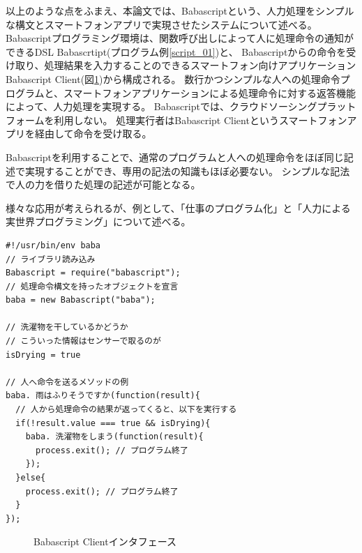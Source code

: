 \documentclass[twoside]{wiss}
\begin{document}
以上のような点をふまえ、本論文では、Babascriptという、人力処理をシンプルな構文とスマートフォンアプリで実現させたシステムについて述べる。
Babascriptプログラミング環境は、関数呼び出しによって人に処理命令の通知ができるDSL Babascrtipt(プログラム例\ref{script_01})と、
% 
Babascriptからの命令を受け取り、処理結果を入力することのできるスマートフォン向けアプリケーションBabascript Client(図\ref{webapp-interface})から構成される。
数行かつシンプルな人への処理命令プログラムと、スマートフォンアプリケーションによる処理命令に対する返答機能によって、人力処理を実現する。
Babascriptでは、クラウドソーシングプラットフォームを利用しない。
処理実行者はBabascript Clientというスマートフォンアプリを経由して命令を受け取る。

Babascriptを利用することで、通常のプログラムと人への処理命令をほぼ同じ記述で実現することができ、専用の記法の知識もほぼ必要ない。
シンプルな記法で人の力を借りた処理の記述が可能となる。

様々な応用が考えられるが、例として、「仕事のプログラム化」と「人力による実世界プログラミング」について述べる。

\begin{lstlisting}[caption=Babascriptプログラム例,label=script_01]
#!/usr/bin/env baba
// ライブラリ読み込み
Babascript = require("babascript");
// 処理命令構文を持ったオブジェクトを宣言
baba = new Babascript("baba");

// 洗濯物を干しているかどうか
// こういった情報はセンサーで取るのが
isDrying = true

// 人へ命令を送るメソッドの例
baba. 雨はふりそうですか(function(result){
  // 人から処理命令の結果が返ってくると、以下を実行する
  if(!result.value === true && isDrying){
    baba. 洗濯物をしまう(function(result){
      process.exit(); // プログラム終了
    });
  }else{
    process.exit(); // プログラム終了
  }
});
\end{lstlisting}

\begin{figure}[!h]  
  \centering
  \caption{Babascript Clientインタフェース}
  \label{webapp-interface}
\end{figure}
\end{document}
